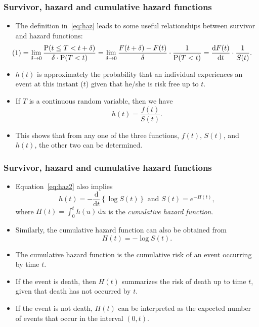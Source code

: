 \documentclass[10pt]{beamer}\usepackage[]{graphicx}\usepackage[]{color}
\newcommand{\dif}{\mathrm{d}}
\newcommand{\empr}[1]{{\emph{\color{red}#1}}}
\newcommand{\p}{\mathrm{P}}
\begin{document}
\begin{frame}
  \frametitle{Survivor, hazard and cumulative hazard functions}
  \begin{itemize}
    \item The definition in~\eqref{eq:haz} leads to some useful relationships between survivor and hazard functions:
      \begin{equation*}
        \hspace{-.5cm}
        (1) = \lim_{\delta\to0}\frac{\p(t\le T < t + \delta)}{\delta\cdot\p(T < t)} = 
        \lim_{\delta\to0}\frac{F(t + \delta) - F(t)}{\delta} \cdot \frac{1}{\p(T < t)} =
        \frac{\dif F(t)}{\dif t}\cdot \frac{1}{S(t)}.
      \end{equation*}
    \item $h(t)$ is approximately the probability that an individual experiences an event at this instant ($t$)
      given that he/she is risk free up to $t$.
    \item If $T$ is a continuous random variable, then we have 
      \begin{equation}
        h(t) = \frac{f(t)}{S(t)}.
        \label{eq:haz2}
      \end{equation}
    \item This shows that from any one of the three functions, $f(t)$, $S(t)$, and $h(t)$, 
      the other two can be determined. 
  \end{itemize}
\end{frame}

\begin{frame}
  \frametitle{Survivor, hazard and cumulative hazard functions}
  \begin{itemize}
    \item Equation~\eqref{eq:haz2} also implies
      $$h(t) = -\frac{\dif}{\dif t}\left\{ \log S(t)\right\} \mbox{ and } S(t) = e^{-H(t)},$$
      where $H(t) = \int_0^th(u)\,\dif u$ is the \empr{cumulative hazard function}.
    \item Similarly, the cumulative hazard function can also be obtained from 
      $$H(t) = -\log S(t).$$
    \item The cumulative hazard function is the cumulative risk of an event occurring by time $t$.
    \item If the event is death, then $H(t)$ summarizes the risk of death up to time $t$, given that death has not occurred by $t$.
    \item If the event is not death, $H(t)$ can be interpreted as the expected number of events that occur in the interval $(0, t)$.
  \end{itemize}
\end{frame}
\end{document}
